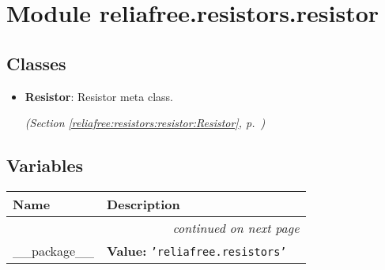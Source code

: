 %
%
%


\section{Module reliafree.resistors.resistor}

    \label{reliafree:resistors:resistor}


\subsection{Classes}

\begin{itemize}  \setlength{\parskip}{0ex}
  \item \textbf{Resistor}: Resistor meta class.



  \textit{(Section \ref{reliafree:resistors:resistor:Resistor}, p.~\pageref{reliafree:resistors:resistor:Resistor})}

\end{itemize}


  \subsection{Variables}

    \vspace{-1cm}
\hspace{\varindent}\begin{longtable}{|p{\varnamewidth}|p{\vardescrwidth}|l}
\cline{1-2}
\cline{1-2} \centering \textbf{Name} & \centering \textbf{Description}& \\
\cline{1-2}
\endhead\cline{1-2}\multicolumn{3}{r}{\small\textit{continued on next page}}\\\endfoot\cline{1-2}
\endlastfoot\raggedright \_\-\_\-p\-a\-c\-k\-a\-g\-e\-\_\-\_\- & \raggedright \textbf{Value:} 
{\tt \texttt{'}\texttt{reliafree.resistors}\texttt{'}}&\\
\cline{1-2}
\end{longtable}

